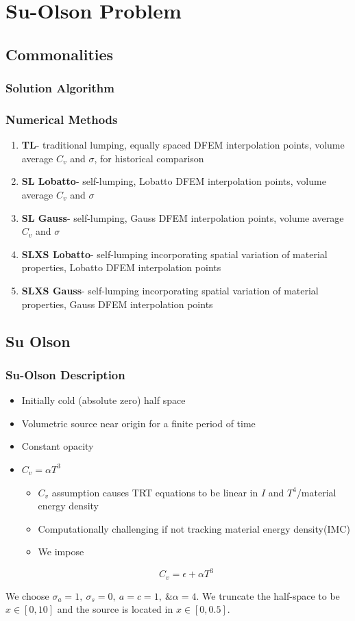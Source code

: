 \documentclass{beamer}
\newcommand{\be}{\begin{equation*}}   %
\newcommand{\ee}{\end{equation*}}
\begin{document}
\section{Su-Olson Problem}
\subsection{Commonalities}

\begin{frame}
\frametitle{Solution Algorithm}

\end{frame}

\begin{frame}
\frametitle{Numerical Methods}
\begin{enumerate}
\item {\bf TL}- traditional lumping, equally spaced DFEM interpolation points, volume average $C_v$ and $\sigma$, for historical comparison 
\item {\bf SL Lobatto}- self-lumping, Lobatto DFEM interpolation points, volume average $C_v$ and $\sigma$ 
\item {\bf SL Gauss}- self-lumping, Gauss DFEM interpolation points, volume average $C_v$ and $\sigma$  
\item {\bf SLXS Lobatto}- self-lumping incorporating spatial variation of material properties, Lobatto DFEM interpolation points 
\item {\bf SLXS Gauss}- self-lumping incorporating spatial variation of material properties, Gauss DFEM interpolation points
\end{enumerate}
\end{frame}

\subsection{Su Olson}
\begin{frame}
\frametitle{Su-Olson Description}
\begin{itemize}
\item Initially cold (absolute zero) half space
\item Volumetric source near origin for a finite period of time
\item Constant opacity
\item $C_v = \alpha T^3$
\begin{itemize}
\item $C_v$ assumption causes TRT equations to be linear in $I$ and $T^4$/material energy density
\item Computationally challenging if not tracking material energy density(IMC)
\item We impose
\end{itemize}
\be
C_v = \epsilon + \alpha T^3
\ee
\end{itemize}
We choose $\sigma_a = 1,~\sigma_s = 0,~a=c=1,~\& \alpha = 4$. 
We truncate the half-space to be $x\in[0,10]$ and the source is located in $x\in[0,0.5]$.
\end{frame}
\end{document}
